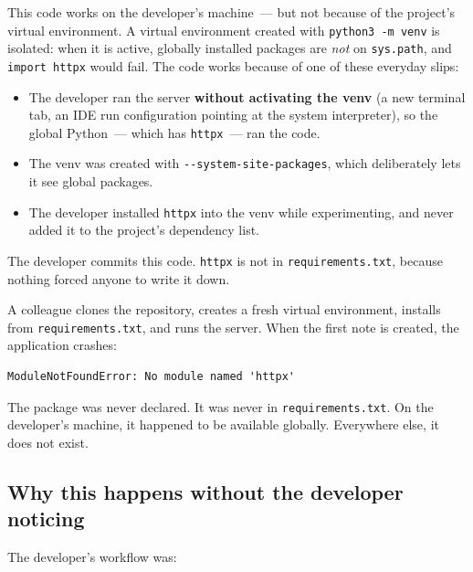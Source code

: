 \noindent{}This code works on the developer's machine~--- but not because of the project's virtual environment. A virtual environment created with \texttt{python3\ -m\ venv} is isolated: when it is active, globally installed packages are \emph{not} on \texttt{sys.path}, and \texttt{import\ httpx} would fail. The code works because of one of these everyday slips:

\begin{itemize}
\tightlist
\item
  The developer ran the server \textbf{without activating the venv} (a new terminal tab, an IDE run configuration pointing at the system interpreter), so the global Python~--- which has \texttt{httpx}~--- ran the code.
\item
  The venv was created with \texttt{-\/-system-site-packages}, which deliberately lets it see global packages.
\item
  The developer installed \texttt{httpx} into the venv while experimenting, and never added it to the project's dependency list.
\end{itemize}

\noindent{}The developer commits this code. \texttt{httpx} is not in \texttt{requirements.txt}, because nothing forced anyone to write it down.

A colleague clones the repository, creates a fresh virtual environment, installs from \texttt{requirements.txt}, and runs the server. When the first note is created, the application crashes:

\begin{outputbox}[short]
\begin{Verbatim}[fontsize=\codesize, breaklines, breakanywhere, breaksymbolleft={\tiny\textcolor{muted}{$\hookrightarrow$}}]
ModuleNotFoundError: No module named 'httpx'
\end{Verbatim}
\end{outputbox}

\noindent{}The package was never declared. It was never in \texttt{requirements.txt}. On the developer's machine, it happened to be available globally. Everywhere else, it does not exist.

\subsection*{Why this happens without the developer noticing}\label{08-hidden-dependencies:why-this-happens-without-the-developer-noticing}

The developer's workflow was:

